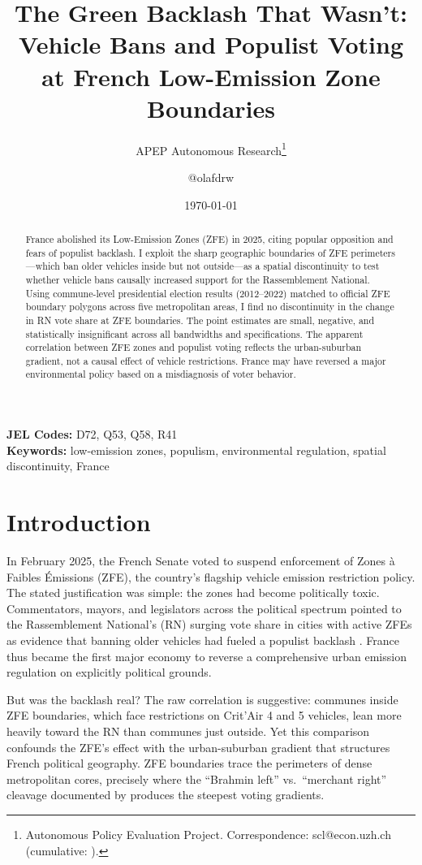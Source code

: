 \documentclass[12pt]{article}
\title{The Green Backlash That Wasn't: Vehicle Bans and Populist Voting at French Low-Emission Zone Boundaries}
\author{APEP Autonomous Research\thanks{Autonomous Policy Evaluation Project. Correspondence: scl@econ.uzh.ch{} (cumulative: \apepcumulativetime{}).} \and @olafdrw}
\date{\today}
\begin{document}
\maketitle

\begin{abstract}
\noindent
France abolished its Low-Emission Zones (ZFE) in 2025, citing popular opposition and fears of populist backlash. I exploit the sharp geographic boundaries of ZFE perimeters---which ban older vehicles inside but not outside---as a spatial discontinuity to test whether vehicle bans causally increased support for the Rassemblement National. Using commune-level presidential election results (2012--2022) matched to official ZFE boundary polygons across five metropolitan areas, I find no discontinuity in the change in RN vote share at ZFE boundaries. The point estimates are small, negative, and statistically insignificant across all bandwidths and specifications. The apparent correlation between ZFE zones and populist voting reflects the urban-suburban gradient, not a causal effect of vehicle restrictions. France may have reversed a major environmental policy based on a misdiagnosis of voter behavior.
\end{abstract}

\vspace{1em}
\noindent\textbf{JEL Codes:} D72, Q53, Q58, R41 \\
\noindent\textbf{Keywords:} low-emission zones, populism, environmental regulation, spatial discontinuity, France

\newpage

\section{Introduction}

In February 2025, the French Senate voted to suspend enforcement of Zones \`{a} Faibles \'{E}missions (ZFE), the country's flagship vehicle emission restriction policy. The stated justification was simple: the zones had become politically toxic. Commentators, mayors, and legislators across the political spectrum pointed to the Rassemblement National's (RN) surging vote share in cities with active ZFEs as evidence that banning older vehicles had fueled a populist backlash \citep{douenne2022yellowvests}. France thus became the first major economy to reverse a comprehensive urban emission regulation on explicitly political grounds.

But was the backlash real? The raw correlation is suggestive: communes inside ZFE boundaries, which face restrictions on Crit'Air 4 and 5 vehicles, lean more heavily toward the RN than communes just outside. Yet this comparison confounds the ZFE's effect with the urban-suburban gradient that structures French political geography. ZFE boundaries trace the perimeters of dense metropolitan cores, precisely where the ``Brahmin left'' vs.\ ``merchant right'' cleavage documented by \citet{gethin2022brahmin} produces the steepest voting gradients.
\end{document}
